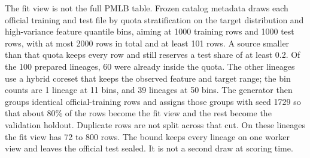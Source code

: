 The fit view is not the full PMLB table. Frozen catalog metadata draws each official training and test file by quota stratification on the target distribution and high-variance feature quantile bins, aiming at 1000 training rows and 1000 test rows, with at most 2000 rows in total and at least 101 rows. A source smaller than that quota keeps every row and still reserves a test share of at least 0.2. Of the 100 prepared lineages, 60 were already inside the quota. The other lineages use a hybrid coreset that keeps the observed feature and target range; the bin counts are 1 lineage at 11 bins, and 39 lineages at 50 bins. The generator then groups identical official-training rows and assigns those groups with seed 1729 so that about 80\% of the rows become the fit view and the rest become the validation holdout. Duplicate rows are not split across that cut. On these lineages the fit view has 72 to 800 rows. The bound keeps every lineage on one worker view and leaves the official test sealed. It is not a second draw at scoring time.
